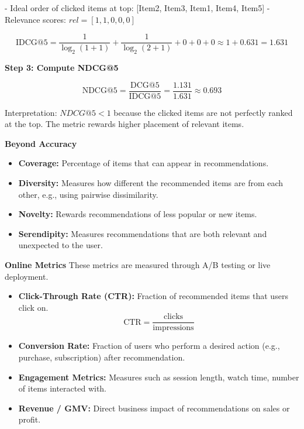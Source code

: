 \documentclass[10pt,a4paper]{article}
\begin{document}
\begin{itemize}
	    - Ideal order of clicked items at top: [Item2, Item3, Item1, Item4, Item5]  
	    - Relevance scores: $rel = [1,1,0,0,0]$
	    
	    \[
	    \text{IDCG@5} = \frac{1}{\log_2(1+1)} + \frac{1}{\log_2(2+1)} + 0 + 0 + 0 \approx 1 + 0.631 = 1.631
	    \]
	    
	    \textbf{Step 3: Compute NDCG@5}
	    
	    \[
	    \text{NDCG@5} = \frac{\text{DCG@5}}{\text{IDCG@5}} = \frac{1.131}{1.631} \approx 0.693
	    \]
	    
	    Interpretation: $NDCG@5 < 1$ because the clicked items are not perfectly ranked at the top. The metric rewards higher placement of relevant items.
	    
	\end{itemize}
	
	\textbf{Beyond Accuracy}  
	\begin{itemize}
	    \item \textbf{Coverage:} Percentage of items that can appear in recommendations.  
	    \item \textbf{Diversity:} Measures how different the recommended items are from each other, e.g., using pairwise dissimilarity.  
	    \item \textbf{Novelty:} Rewards recommendations of less popular or new items.  
	    \item \textbf{Serendipity:} Measures recommendations that are both relevant and unexpected to the user.
	\end{itemize}
	
	\textbf{Online Metrics}  
	These metrics are measured through A/B testing or live deployment.
	
	\begin{itemize}
	    \item \textbf{Click-Through Rate (CTR):} Fraction of recommended items that users click on.
	    \[
	    \text{CTR} = \frac{\text{clicks}}{\text{impressions}}
	    \]
	    \item \textbf{Conversion Rate:} Fraction of users who perform a desired action (e.g., purchase, subscription) after recommendation.  
	    \item \textbf{Engagement Metrics:} Measures such as session length, watch time, number of items interacted with.  
	    \item \textbf{Revenue / GMV:} Direct business impact of recommendations on sales or profit.
	\end{itemize}
	
\end{document}
